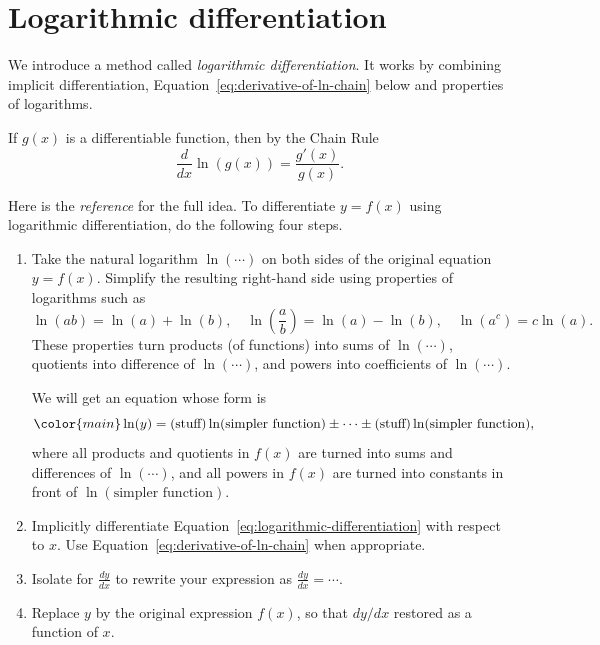 \documentclass[../main.tex]{subfiles}
\begin{document}
 \section{Logarithmic differentiation}
We introduce a method called \emph{logarithmic differentiation}. It works by combining implicit differentiation, Equation~\eqref{eq:derivative-of-ln-chain} below and properties of logarithms.
\begin{mdframed}[style=withref]
  If \(g(x)\) is a differentiable function, then by the Chain Rule
  \begin{equation} \label{eq:derivative-of-ln-chain}
    \frac{d}{dx} \ln( g(x) ) = \frac{g'(x)}{g(x)}.
  \end{equation}

\end{mdframed}


Here is the \emph{reference} for the full idea. To differentiate \(y = f(x)\) using logarithmic differentiation, do the following four steps.
\begin{enumerate}
  \item Take the natural logarithm \(\ln(\cdots{})\) on both sides of the original equation \(y = f(x)\). Simplify the resulting right-hand side using properties of logarithms such as
    \[
      \ln(ab) = \ln(a) + \ln(b), \quad \ln\left(\frac{a}{b}\right) = \ln(a) - \ln(b), \quad \ln(a^{c}) = c \ln(a).
    \]
    These properties turn products (of functions) into sums of \(\ln(\cdots)\), quotients into difference of \(\ln(\cdots)\), and powers into coefficients of \(\ln(\cdots)\).

    We will get an equation whose form is
    \begin{equation} \label{eq:logarithmic-differentiation}
      \color{main}
      \ln(y) = (\text{stuff})\ln( \text{simpler function} ) \pm \cdots \pm (\text{stuff})\ln( \text{simpler function} ),
    \end{equation}
    where all products and quotients in \(f(x)\) are turned into sums and differences of \(\ln(\cdots)\), and all powers in \(f(x)\) are turned into constants in front of \(\ln(\text{simpler function})\).


  \item Implicitly differentiate Equation~\eqref{eq:logarithmic-differentiation} with respect to \(x\). Use Equation~\eqref{eq:derivative-of-ln-chain} when appropriate.

  \item Isolate for \(\frac{dy}{dx}\) to rewrite your expression as \(\frac{dy}{dx} = \cdots\).
  \item Replace \(y\) by the original expression \(f(x)\), so that \(dy/dx\) restored as a function of \(x\).
\end{enumerate}
\clearpage
\end{document}

